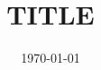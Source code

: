 
\subject{Sheet Nr. 3}
\title{TITLE}
\date{\today}



\maketitle
\thispagestyle{empty}
\newpage




